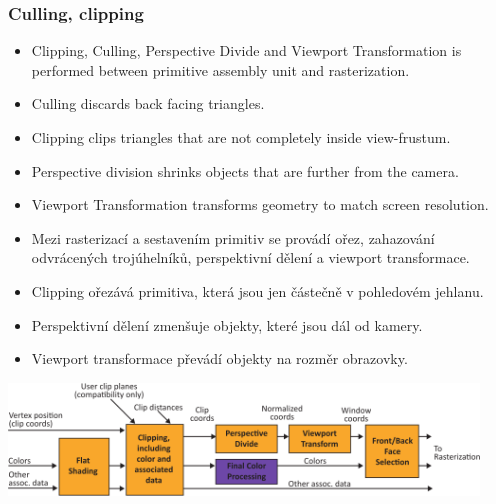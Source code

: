 \begin{frame}
\frametitle{Culling, clipping}
  \scriptsize
	\begin{itemize}
		\item Clipping, Culling, Perspective Divide and Viewport Transformation is performed between primitive assembly unit and rasterization.
    \item Culling discards back facing triangles.
    \item Clipping clips triangles that are not completely inside view-frustum.
    \item Perspective division shrinks objects that are further from the camera.
    \item Viewport Transformation transforms geometry to match screen resolution.
	\end{itemize}
	\begin{itemize}
    \item Mezi rasterizací a sestavením primitiv se provádí ořez, zahazování odvrácených trojúhelníků, perspektivní dělení a viewport transformace.
    \item Clipping ořezává primitiva, která jsou jen částečně v pohledovém jehlanu.
    \item Perspektivní dělení zmenšuje objekty, které jsou dál od kamery.
    \item Viewport transformace převádí objekty na rozměr obrazovky.
	\end{itemize}
	\includegraphics[width=12.5cm,keepaspectratio]{pics/pipeline/OpenGL460PipelineClipping}
\end{frame}

